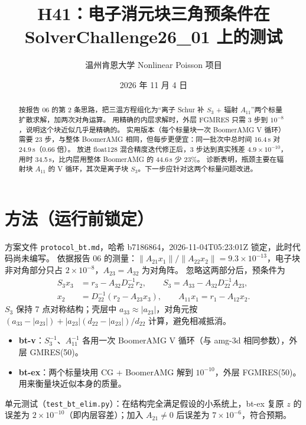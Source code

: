 \documentclass[11pt,a4paper]{ctexart}
\title{H41：电子消元块三角预条件在 SolverChallenge26\_01 上的测试}
\author{温州肯恩大学 \quad Nonlinear Poisson 项目}
\date{2026 年 11 月 4 日}
\begin{document}
\maketitle

\begin{abstract}
按报告 06 的第 2 条思路，把三温方程组化为“离子 Schur 补 $S_3$ + 辐射 $A_{11}$”两个标量扩散求解，加两次对角运算。
用精确的内层求解时，外层 FGMRES 只需 3 步到 $10^{-8}$，说明这个块近似几乎是精确的。
实用版本（每个标量块一次 BoomerAMG V 循环）需要 23 步，与整体 BoomerAMG 相同，但每步更便宜：同一批次中总时间 16.4\,s 对 24.9\,s（0.66 倍）。
放进 float128 混合精度迭代修正后，3 步达到真实残差 $4.9\times10^{-10}$，用时 34.5\,s，比内层用整体 BoomerAMG 的 44.6\,s 少 23\%。
诊断表明，瓶颈主要在辐射块 $A_{11}$ 的 V 循环，其次是离子块 $S_3$。下一步应针对这两个标量问题改进。
\end{abstract}

\section{方法（运行前锁定）}
方案文件 \texttt{protocol\_bt.md}，哈希 b7186864，2026-11-04T05:23:01Z 锁定，此时代码尚未编写。
依据报告 06 的测量：$\|A_{21}x_1\|/\|A_{22}x_2\|=9.3\times10^{-13}$，电子块非对角部分只占 $2\times10^{-8}$，$A_{23}=A_{32}$ 为对角阵。
忽略这两部分后，预条件为
\begin{align*}
S_3x_3&=r_3-A_{32}D_{22}^{-1}r_2,\qquad S_3=A_{33}-A_{32}D_{22}^{-1}A_{23},\\
x_2&=D_{22}^{-1}(r_2-A_{23}x_3),\qquad A_{11}x_1=r_1-A_{12}x_2 .
\end{align*}
$S_3$ 保持 7 点对称结构；壳层中 $a_{33}\approx|a_{23}|$，对角元按 $(a_{33}-|a_{23}|)+|a_{23}|(d_{22}-|a_{23}|)/d_{22}$ 计算，避免相减抵消。
\begin{itemize}
\item \textbf{bt-v}：$S_3^{-1}$、$A_{11}^{-1}$ 各用一次 BoomerAMG V 循环（与 amg-3d 相同参数），外层 GMRES(50)。
\item \textbf{bt-ex}：两个标量块用 CG + BoomerAMG 解到 $10^{-10}$，外层 FGMRES(50)。用来衡量块近似本身的质量。
\end{itemize}
单元测试（\texttt{test\_bt\_elim.py}）：在结构完全满足假设的小系统上，bt-ex 复原 $z$ 的误差为 $2\times10^{-10}$（即内层容差）；加入 $A_{21}\ne0$ 后误差为 $7\times10^{-6}$，符合预期。
\end{document}
